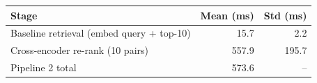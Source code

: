 \begin{tabular}{lrr}
\toprule
Stage & Mean (ms) & Std (ms) \\
\midrule
Baseline retrieval (embed query + top-10) & 15.7 & 2.2 \\
Cross-encoder re-rank (10 pairs) & 557.9 & 195.7 \\
Pipeline 2 total & 573.6 & -- \\
\bottomrule
\end{tabular}
